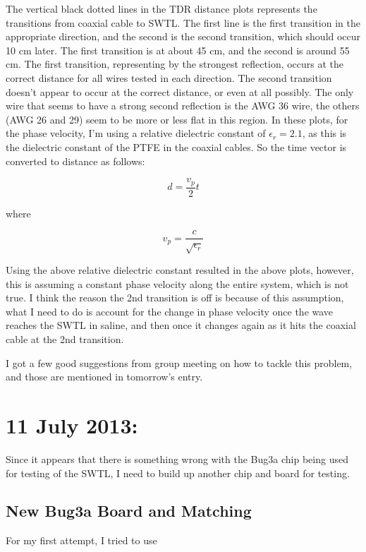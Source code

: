 \documentclass[12pt,onecolumn,titlepage]{article}
\begin{document}
The vertical black dotted lines in the TDR distance plots represents the transitions from coaxial cable to SWTL. The first line is the first transition in the appropriate direction, and the second is the second transition, which should occur 10 cm later. The first transition is at about 45 cm, and the second is around 55 cm. The first transition, representing by the strongest reflection, occurs at the correct distance for all wires tested in each direction. The second transition doesn't appear to occur at the correct distance, or even at all possibly. The only wire that seems to have a strong second reflection is the AWG 36 wire, the others (AWG 26 and 29) seem to be more or less flat in this region. In these plots, for the phase velocity, I'm using a relative dielectric constant of $\epsilon_r = 2.1$, as this is the dielectric constant of the PTFE in the coaxial cables. So the time vector is converted to distance as follows:

\[d = \frac{v_p}{2} t \]

where

\[v_p = \frac{c}{\sqrt{\epsilon_r}} \]

Using the above relative dielectric constant resulted in the above plots, however, this is assuming a constant phase velocity along the entire system, which is not true. I think the reason the 2nd transition is off is because of this assumption, what I need to do is account for the change in phase velocity once the wave reaches the SWTL in saline, and then once it changes again as it hits the coaxial cable at the 2nd transition. 

I got a few good suggestions from group meeting on how to tackle this problem, and those are mentioned in tomorrow's entry.


\clearpage
\section{11 July 2013:}

\indent \indent Since it appears that there is something wrong with the Bug3a chip being used for testing of the SWTL, I need to build up another chip and board for testing.


\subsection{New Bug3a Board and Matching}
\indent \indent For my first attempt, I tried to use
\end{document}
